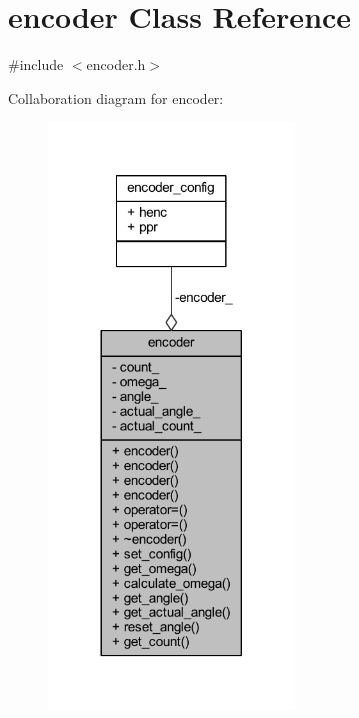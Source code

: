 \hypertarget{classencoder}{}\section{encoder Class Reference}
\label{classencoder}


{\ttfamily \#include $<$encoder.\+h$>$}



Collaboration diagram for encoder\+:
\nopagebreak
\begin{figure}[H]
\begin{center}
\leavevmode
\includegraphics[width=185pt]{classencoder__coll__graph}
\end{center}
\end{figure}

